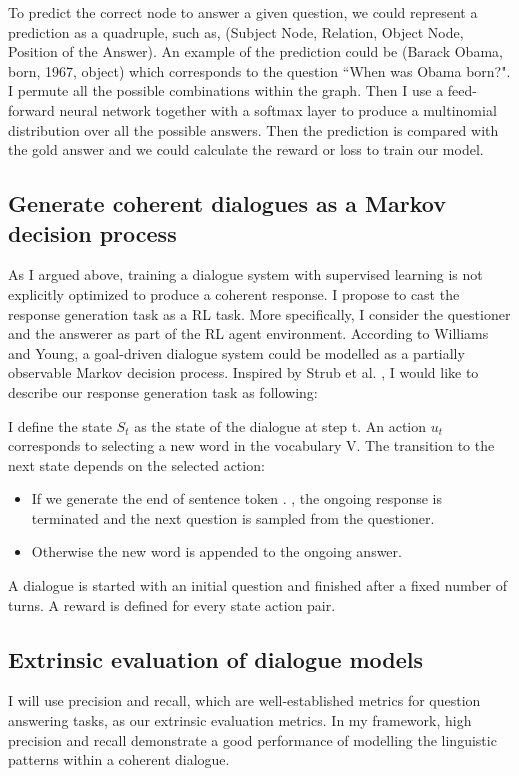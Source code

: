 \documentclass[bsc,frontabs,twoside,singlespacing,parskip,deptreport]{infthesis}     %
\begin{document}
To predict the correct node to answer a given question, we could represent a prediction as a quadruple, such as, (Subject Node, Relation, Object Node, Position of the Answer). An example of the prediction could be (Barack Obama, born, 1967, object) which corresponds to the question ``When was Obama born?". I permute all the possible combinations within the graph. Then I use a feed-forward neural network together with a softmax layer to produce a multinomial distribution over all the possible answers. Then the prediction is compared with the gold answer and we could calculate the reward or loss to train our model.

\subsection{Generate coherent dialogues as a Markov decision process}
\noindent
As I argued above, training a dialogue system with supervised learning is not explicitly optimized to produce a coherent response. I propose to cast the response generation task as a RL task. More specifically, I consider the questioner and the answerer as part of the RL agent environment. According to Williams and Young\cite{williams2007partially}, a goal-driven dialogue system could be modelled as a partially observable Markov decision process. Inspired by Strub et al. \cite{strub2017end}, I would like to describe our response generation task as following:

I define the state $S_t$ as the state of the dialogue at step t. An action $u_t$ corresponds to selecting a new word in the vocabulary V. The transition to the next state depends on the selected action:

\begin{itemize}
\item If we generate the end of sentence token . , the ongoing response is terminated and the next question is sampled from the questioner.
\item Otherwise the new word is appended to the ongoing answer.
\end{itemize}

A dialogue is started with an initial question and finished after a fixed number of turns. A reward is defined for every state action pair. 

\subsection{Extrinsic evaluation of dialogue models}
\noindent
I will use precision and recall, which are well-established metrics for question answering tasks, as our extrinsic evaluation metrics. In my framework, high precision and recall demonstrate a good performance of modelling the linguistic patterns within a coherent dialogue.
\end{document}
